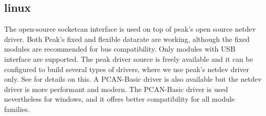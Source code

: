 \documentclass[letterpaper,10pt,english]{sphinxmanual}
\begin{document}
\subsection{linux}
\label{\detokenize{vendors/peak:linux}}
The open-source socketcan interface is used on top of peak’s open source netdev driver. Both Peak’s
fixed and flexible datarate are working, although the fixed modules are recommended for bus compatibility.
Only modules with USB interface are supported.
The peak driver source is freely available and it can be configured to build several
types of drivers, where we use peak’s netdev driver only. See  for details on this.
A PCAN-Basic driver is also available but the netdev driver is more performant and modern. The
PCAN-Basic driver is used nevertheless for windows, and it offers better compatibility for all module
families.
\end{document}
